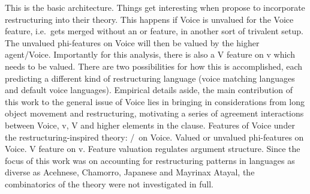 This is the basic architecture. Things get interesting when \cite{wurmbrandshimamura17} propose to incorporate restructuring into their theory. This happens if Voice is unvalued for the Voice feature, i.e.~gets merged without an  or  feature, in another sort of trivalent setup. The unvalued phi-features on Voice will then be valued by the higher agent/Voice. Importantly for this analysis, there is also a V feature on v which needs to be valued. There are two possibilities for how this is accomplished, each predicting a different kind of restructuring language (voice matching languages and default voice languages). Empirical details aside, the main contribution of this work to the general issue of Voice lies in bringing in considerations from long object movement and restructuring, motivating a series of agreement interactions between Voice, v, V and higher elements in the clause.
\pex Features of Voice under the restructuring-inspired theory:
	\a {}/\zero~on Voice.
	\a Valued or unvalued phi-features on Voice.
	\a V feature on v.
\xe
Feature valuation regulates argument structure. Since the focus of this work was on accounting for restructuring patterns in languages as diverse as Acehnese, Chamorro, Japanese and  Mayrinax Atayal, the combinatorics of the theory were not investigated in full.

